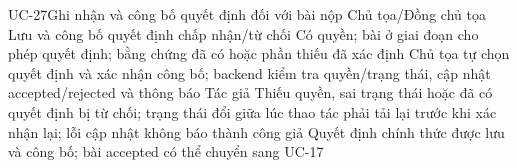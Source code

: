 \UseCaseSpec
{UC-27}{Ghi nhận và công bố quyết định đối với bài nộp}
{Chủ tọa/Đồng chủ tọa}
{Lưu và công bố quyết định chấp nhận/từ chối}
{Có quyền; bài ở giai đoạn cho phép quyết định; bằng chứng đã có hoặc phần thiếu đã xác định}
{Chủ tọa tự chọn quyết định và xác nhận công bố; backend kiểm tra quyền/trạng thái, cập nhật accepted/rejected và thông báo Tác giả}
{Thiếu quyền, sai trạng thái hoặc đã có quyết định bị từ chối; trạng thái đổi giữa lúc thao tác phải tải lại trước khi xác nhận lại; lỗi cập nhật không báo thành công giả}
{Quyết định chính thức được lưu và công bố; bài accepted có thể chuyển sang UC-17}
